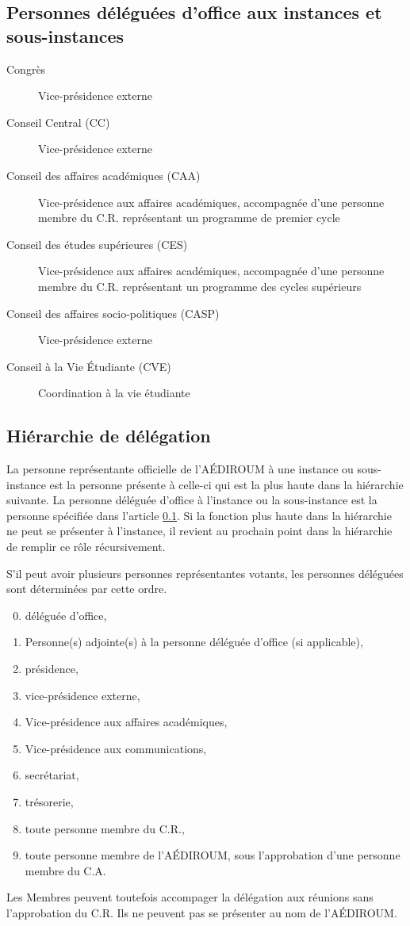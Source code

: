 \documentclass{aediroum}
\newcommand{\article}[1]{article \ref{#1}}
\begin{document}
\subsection{Personnes déléguées d’office aux instances et sous-instances}\label{sec:delegues-doffice-instances}
\begin{description}
\item[Congrès] Vice-présidence externe
\item[Conseil Central (CC)] Vice-présidence externe
\item[Conseil des affaires académiques (CAA)] Vice-présidence aux affaires académiques, accompagnée d’une personne membre du C.R. représentant
un programme de premier cycle
\item[Conseil des études supérieures (CES)] Vice-présidence aux affaires académiques, accompagnée
d’une personne membre du C.R. représentant un programme des cycles supérieurs
\item[Conseil des affaires socio-politiques (CASP)] Vice-présidence externe
\item[Conseil à la Vie Étudiante (CVE)] Coordination à la vie étudiante
\end{description}

\subsection{Hiérarchie de délégation}\label{sec:hierarchie-delegues-faecum}

La personne représentante officielle de l'AÉDIROUM à une instance ou sous-instance est la personne présente à celle-ci qui est la plus haute dans la hiérarchie suivante. La personne déléguée d'office à l'instance ou la sous-instance est la personne spécifiée dans l'\article{sec:delegues-doffice-instances}. Si la fonction plus haute dans la hiérarchie ne peut se présenter à l'instance, il revient au prochain point dans la hiérarchie de remplir ce rôle récursivement.

S'il peut avoir plusieurs personnes représentantes votants, les personnes déléguées sont déterminées par cette ordre.

\begin{enumerate}\setcounter{enumi}{-1}
\item déléguée d'office,
\item Personne(s) adjointe(s) à la personne déléguée d’office (si applicable),
\item présidence,
\item vice-présidence externe,
\item Vice-présidence aux affaires académiques,
\item Vice-présidence aux communications,
\item secrétariat,
\item trésorerie,
\item toute personne membre du C.R.,
\item toute personne membre de l'AÉDIROUM, sous l'approbation d'une personne membre du C.A.
\end{enumerate}

Les Membres peuvent toutefois accompager la délégation aux réunions sans l'approbation du C.R. Ils ne peuvent pas se présenter au nom de l'AÉDIROUM.
\end{document}

